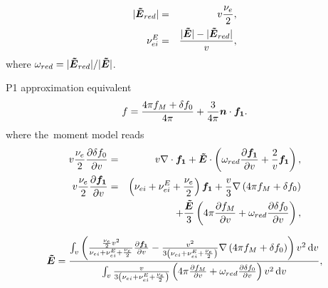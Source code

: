 \begin{eqnarray}
  |\boldsymbol{\tilde{E}}_{red}| &=& v\frac{\nu_{e}}{2} ,
  \nonumber \\
  \nu_{ei}^E &=& \frac{|\boldsymbol{\tilde{E}}| - |\boldsymbol{\tilde{E}}_{red}|}{v} ,
  \nonumber
\end{eqnarray}
where $\omega_{red} = |\boldsymbol{\tilde{E}}_{red}| / |\boldsymbol{\tilde{E}}|$.

P1 approximation equivalent
\begin{equation}
  f = \frac{4\pi f_M + \delta f_0}{4\pi} + \frac{3}{4\pi}\boldsymbol{n}\cdot\boldsymbol{f_1} .
  \label{eq:OOE_P1outofeq}
\end{equation}
where the~moment model reads
\begin{eqnarray}
  v \frac{\nu_{e}}{2}\frac{\partial{\delta f_0}}{\partial{v}} &=&
  v\nabla\cdot\boldsymbol{f_1} + \boldsymbol{\tilde{E}}\cdot\left(\omega_{red} \frac{\partial{\boldsymbol{f_1}}}{\partial{v}} 
  + \frac{2}{v}\boldsymbol{f_1}\right) , 
  \nonumber\\
  v\frac{\nu_{e}}{2}\frac{\partial{\boldsymbol{f_1}}}{\partial{v}} 
  &=& \left(\nu_{ei} + \nu_{ei}^E + \frac{\nu_{e}}{2}\right)\boldsymbol{f_1} 
  + \frac{v}{3}\nabla\left(4\pi f_M + \delta f_0\right)
  \nonumber \\
  && 
  + \frac{\boldsymbol{\tilde{E}}}{3}\left(4\pi \frac{\partial{f_M}}{\partial{v}} + \omega_{red} \frac{\partial{\delta f_0}}{\partial{v}} 
  \right) ,
  \nonumber
\end{eqnarray}

\begin{equation}
  \boldsymbol{\tilde{E}} =
  \frac{\int_{v} \left(\frac{\frac{\nu_{e}}{2}v^2}
  {\nu_{ei} + \nu_{ei}^E + \frac{\nu_{e}}{2}}\frac{\partial{\boldsymbol{f_1}}}{\partial{v}}
  - \frac{v^2}{3\left(\nu_{ei} + \nu_{ei}^E + \frac{\nu_{e}}{2}\right)}
  \nabla\left(4\pi f_M + \delta f_0\right)\right) v^2\, \text{d}v}
  {\int_{v} \frac{v}
  {3\left(\nu_{ei} + \nu_{ei}^E + \frac{\nu_{e}}{2}\right)}
  \left(4\pi\frac{\partial{f_M}}{\partial{v}} + \omega_{red} \frac{\partial{\delta f_0}}{\partial{v}}\right)
  v^2\, \text{d}v} ,
  \nonumber
\end{equation}

